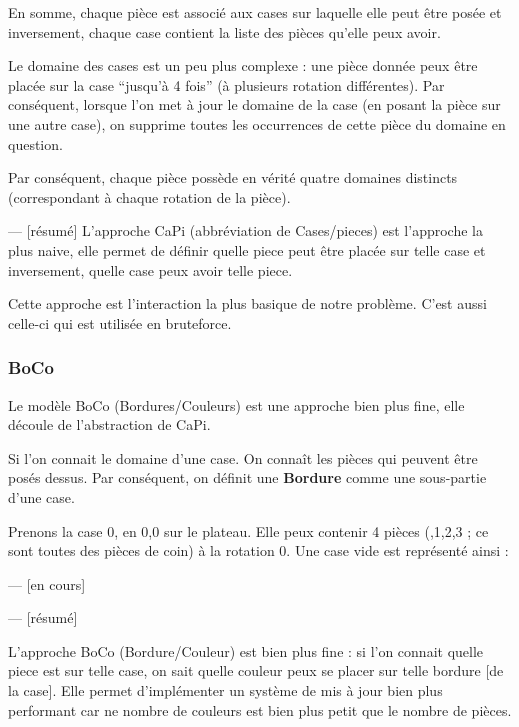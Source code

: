 	En somme, chaque pièce est associé aux cases sur laquelle elle peut être posée et inversement, chaque case contient la liste des pièces qu'elle peux avoir.
	
	\begin{rem}
		Le domaine des cases est un peu plus complexe : une pièce donnée peux être placée sur la case \enquote{jusqu'à 4 fois} (à plusieurs rotation différentes). Par conséquent, lorsque l'on met à jour le domaine de la case (en posant la pièce sur une autre case), on supprime toutes les occurrences de cette pièce du domaine en question.
		
		Par conséquent, chaque pièce possède en vérité quatre domaines distincts (correspondant à chaque rotation de la pièce).
	\end{rem}

--- [résumé]
	L'approche CaPi (abbréviation de Cases/pieces) est l'approche la plus naive, elle permet de définir quelle piece peut être placée sur telle case et inversement, quelle case peux avoir telle piece.

	Cette approche est l'interaction la plus basique de notre problème. C'est aussi celle-ci qui est utilisée en bruteforce.

	\subsubsection{BoCo}
	
	Le modèle BoCo (Bordures/Couleurs) est une approche bien plus fine, elle découle de l'abstraction de CaPi.
	
	Si l'on connait le domaine d'une case. On connaît les pièces qui peuvent être posés dessus. Par conséquent, on définit une \textbf{Bordure} comme une sous-partie d'une case.
	
	\begin{exmp}
		Prenons la case 0, en 0,0 sur le plateau. Elle peux contenir 4 pièces (,1,2,3 ; ce sont toutes des pièces de coin) à la rotation 0.
		Une case vide est représenté ainsi :
		
		\begin{figure}[H]
		\end{figure}
		
	---	[en cours]
	\end{exmp}
	
	--- [résumé]

	L'approche BoCo (Bordure/Couleur) est bien plus fine : si l'on connait quelle piece est sur telle case, on sait quelle couleur peux se placer sur telle bordure [de la case]. Elle permet d'implémenter un système de mis à jour bien plus performant car ne nombre de couleurs est bien plus petit que le nombre de pièces.

